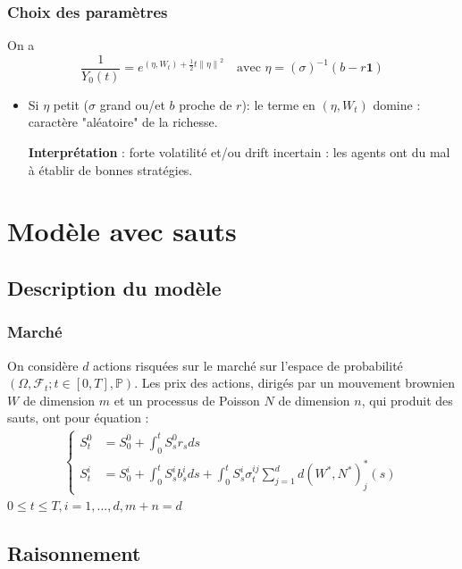 \documentclass{beamer}
\begin{document}
\begin{frame}
\frametitle{Choix des paramètres}
\par On a 
\begin{displaymath}
\frac{1}{Y_0 \left( t \right)} = e^{ \left( \eta, W_{t} \right) + \frac{1}{2} t {\| \eta \|}^{2}} \quad \text{avec } \eta = (\sigma)^{-1} (b - r \textbf{1})
\end{displaymath}
\begin{itemize}
\item Si $\eta$ petit ($\sigma$ grand ou/et $b$ proche de $r$): le terme en $\left( \eta, W_{t} \right)$ domine : caractère "aléatoire" de la richesse.
\par \textbf{Interprétation} : forte volatilité et/ou drift incertain : les agents ont du mal à établir de bonnes stratégies.
\end{itemize}
\end{frame}


%

\section{Modèle avec sauts}
\subsection{Description du modèle}

\begin{frame}
\frametitle{Marché}
On considère $d$ actions risquées sur le marché sur l'espace de probabilité $(\Omega, \mathcal{F}_t; t\in [0, T], \mathbb{P})$. Les prix des actions, dirigés par un mouvement brownien $W$ de dimension $m$ et un processus de Poisson $N$ de dimension $n$, qui produit des sauts, ont pour équation :
\begin{align*}
\begin{cases}
S^0_t &= S_0^0 + \int_{0}^{t} S^0_s r_s ds \\
S_t^i &= S_0^i + \int_{0}^{t}S_s^i b_s^i ds + \int_{0}^{t}S_s^i \sigma^{ij}_t \sum_{j = 1}^{d} d(W^*, N^*)^{*}_j(s) \end{cases}
\end{align*}
$ 0 \leq t \leq T, i = 1, ..., d, m+n = d$
\end{frame}

\subsection{Raisonnement}
\end{document}
